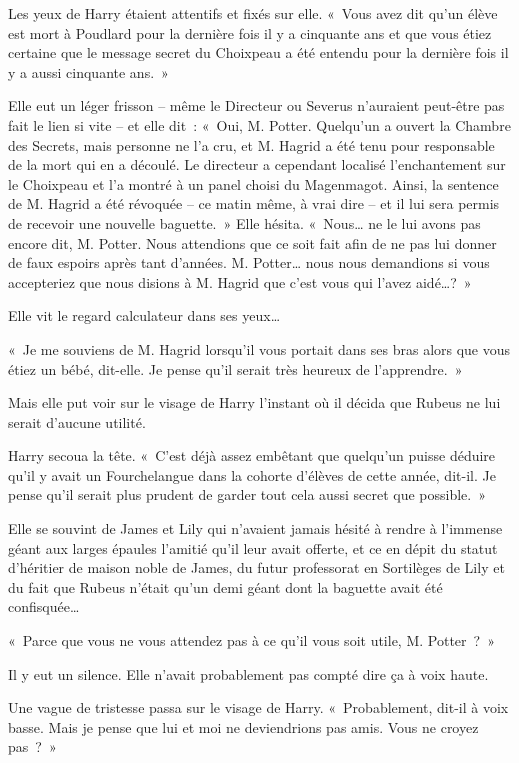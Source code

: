 Les yeux de Harry étaient attentifs et fixés sur elle.
«~Vous avez dit qu'un élève est mort à Poudlard pour la dernière fois il y a cinquante ans et que vous étiez certaine que le message secret du Choixpeau a été entendu pour la dernière fois il y a aussi cinquante ans.~»

Elle eut un léger frisson -- même le Directeur ou Severus n'auraient peut-être pas fait le lien si vite -- et elle dit~: «~Oui, M. Potter.
Quelqu'un a ouvert la Chambre des Secrets, mais personne ne l'a cru, et M. Hagrid a été tenu pour responsable de la mort qui en a découlé.
Le directeur a cependant localisé l'enchantement sur le Choixpeau et l'a montré à un panel choisi du Magenmagot.
Ainsi, la sentence de M. Hagrid a été révoquée -- ce matin même, à vrai dire -- et il lui sera permis de recevoir une nouvelle baguette.~»
Elle hésita.
«~Nous… ne le lui avons pas encore dit, M. Potter.
Nous attendions que ce soit fait afin de ne pas lui donner de faux espoirs après tant d'années.
M. Potter… nous nous demandions si vous accepteriez que nous disions à M. Hagrid que c'est vous qui l'avez aidé…?~»

Elle vit le regard calculateur dans ses yeux…

«~Je me souviens de M. Hagrid lorsqu'il vous portait dans ses bras alors que vous étiez un bébé, dit-elle.
Je pense qu'il serait très heureux de l'apprendre.~»

Mais elle put voir sur le visage de Harry l'instant où il décida que Rubeus ne lui serait d'aucune utilité.

Harry secoua la tête.
«~C'est déjà assez embêtant que quelqu'un puisse déduire qu'il y avait un Fourchelangue dans la cohorte d'élèves de cette année, dit-il.
Je pense qu'il serait plus prudent de garder tout cela aussi secret que possible.~»

Elle se souvint de James et Lily qui n'avaient jamais hésité à rendre à l'immense géant aux larges épaules l'amitié qu'il leur avait offerte, et ce en dépit du statut d'héritier de maison noble de James, du futur professorat en Sortilèges de Lily et du fait que Rubeus n'était qu'un demi géant dont la baguette avait été confisquée…

«~Parce que vous ne vous attendez pas à ce qu'il vous soit utile, M. Potter~?~»

Il y eut un silence.
Elle n'avait probablement pas compté dire ça à voix haute.

Une vague de tristesse passa sur le visage de Harry.
«~Probablement, dit-il à voix basse.
Mais je pense que lui et moi ne deviendrions pas amis.
Vous ne croyez pas~?~»

